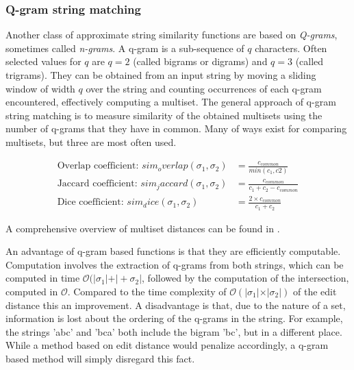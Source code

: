 
\subsubsection{Q-gram string matching}
\label{sec:qgram}

Another class of approximate string similarity functions are based on \emph{Q-grams}, sometimes called \emph{n-grams}.
A q-gram is a sub-sequence of $q$ characters.
Often selected values for $q$ are $q=2$ (called bigrams or digrams) and $q=3$ (called trigrams).
They can be obtained from an input string by moving a sliding window of width $q$ over the string and counting occurrences of each q-gram encountered, effectively computing a multiset.
The general approach of q-gram string matching is to measure similarity of the obtained multisets using the number of q-grams that they have in common.
Many of ways exist for comparing multisets, but three are most often used.

\begin{align}
    \text{Overlap coefficient: }sim_overlap(\sigma_1, \sigma_2) &= \frac{c_{common}}{min(c_1, c2)} \\
    \text{Jaccard coefficient: }sim_jaccard(\sigma_1, \sigma_2) &= \frac{c_{common}}{c_1 + c_2 - c_{common}} \\
    \text{Dice coefficient: }sim_dice(\sigma_1, \sigma_2) &= \frac{2 \times c_{common}}{c_1 + c_2}
\end{align}

\noindent A comprehensive overview of multiset distances can be found in \cite{kosters08}.

An advantage of q-gram based functions is that they are efficiently computable.
Computation involves the extraction of q-grams from both strings, which can be computed in time $\mathcal{O}(\vert \sigma_1 \vert + \vert + \sigma_2 \vert$, followed by the computation of the intersection, computed in $\mathcal{O}$.
Compared to the time complexity of $\mathcal{O}(\vert \sigma_1 \vert \times \vert \sigma_2 \vert)$ of the edit distance this an improvement.
A disadvantage is that, due to the nature of a set, information is lost about the ordering of the q-grams in the string.
For example, the strings 'abc' and 'bca' both include the bigram 'bc', but in a different place.
While a method based on edit distance would penalize accordingly, a q-gram based method will simply disregard this fact.




